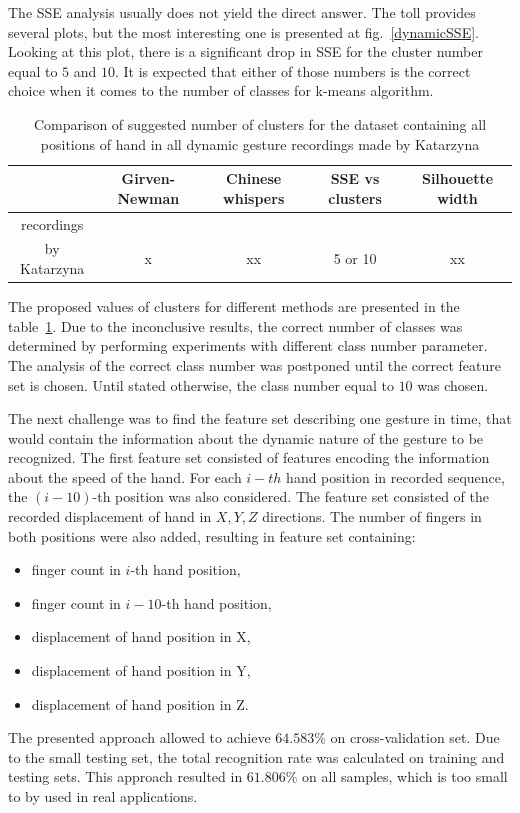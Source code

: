 The SSE analysis usually does not yield the direct answer.
The toll provides several plots, but the most interesting one is presented at fig.~\ref{dynamicSSE}. 
Looking at this plot, there is a significant drop in SSE for the cluster number equal to $5$ and $10$.
It is expected that either of those numbers is the correct choice when it comes to the number of classes for k-means algorithm.



\begin{table}[ht]
 \caption{Comparison of suggested number of clusters for the dataset containing all positions of hand in all dynamic gesture recordings made by Katarzyna}
 \label{clusterwyn}
    \begin{tabular}{ccccc}
    \hline
     & Girven-Newman & Chinese whispers   & SSE vs clusters & Silhouette width  \\ \hline
    recordings \\by Katarzyna          & x      & xx & 5 or 10     & xx     \\ \hline
    \end{tabular}
\end{table}

The proposed values of clusters for different methods are presented in the table~\ref{clusterwyn}.
Due to the inconclusive results, the correct number of classes was determined by performing experiments with different class number parameter.
The analysis of the correct class number was postponed until the correct feature set is chosen.
Until stated otherwise, the class number equal to $10$ was chosen.

The next challenge was to find the feature set describing one gesture in time, that would contain the information about the dynamic nature of the gesture to be recognized. 
The first feature set consisted of features encoding the information about the speed of the hand. For each $i-th$ hand position in recorded sequence, the $(i-10)$-th position was also considered. 
The feature set consisted of the recorded displacement of hand in $X, Y, Z$ directions.
The number of fingers in both positions were also added, resulting in feature set containing:
\begin{itemize}
\item finger count in $i$-th hand position,
\item finger count in $i-10$-th hand position,
\item displacement of hand position in X,
\item displacement of hand position in Y,
\item displacement of hand position in Z.
\end{itemize}
The presented approach allowed to achieve $64.583\%$ on cross-validation set. 
Due to the small testing set, the total recognition rate was calculated on training and testing sets.
This approach resulted in $61.806\%$ on all samples, which is too small to by used in real applications.

